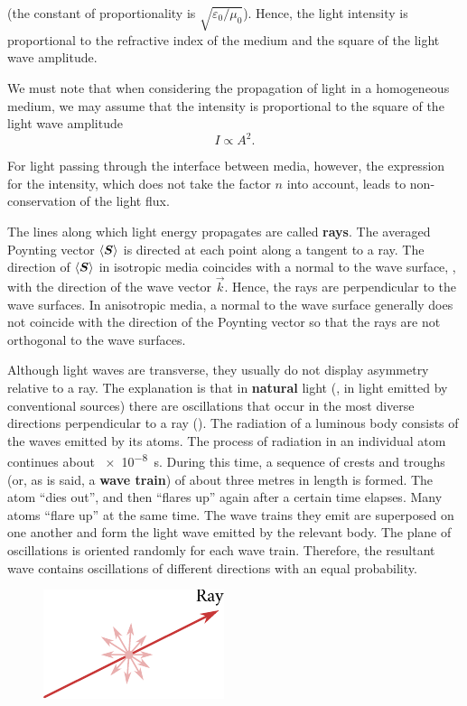 \noindent
(the constant of proportionality is $\sqrt{\varepsilon_0/\mu_0}$).
Hence, the light intensity is proportional to the refractive index of the medium and the square of the light wave amplitude.

We must note that when considering the propagation of light in a homogeneous medium, we may assume that the intensity is proportional to the square of the light wave amplitude
\begin{equation}\label{eq:16_10}
    I \propto A^2.
\end{equation}

\noindent
For light passing through the interface between media, however, the expression for the intensity, which does not take the factor $n$ into account, leads to non-conservation of the light flux.

The lines along which light energy propagates are called \textbf{rays}.
The averaged Poynting vector $\left\langle \boldsymbol{S} \right\rangle$ is directed at each point along a tangent to a ray.
The direction of $\left\langle \boldsymbol{S} \right\rangle$ in isotropic media coincides with a normal to the wave surface, \ie, with the direction of the wave vector $\vec{k}$.
Hence, the rays are perpendicular to the wave surfaces.
In anisotropic media, a normal to the wave surface generally does not coincide with the direction of the Poynting vector so that the rays are not orthogonal to the wave surfaces.

Although light waves are transverse, they usually do not display asymmetry relative to a ray.
The explanation is that in \textbf{natural} light (\ie, in light emitted by conventional sources) there are oscillations that occur in the most diverse directions perpendicular to a ray ().
The radiation of a luminous body consists of the waves emitted by its atoms.
The process of radiation in an individual atom continues about \SI{e-8}{\second}.
During this time, a sequence of crests and troughs (or, as is said, a \textbf{wave train}) of about three metres in length is formed.
The atom ``dies out'', and then ``flares up'' again after a certain time elapses.
Many atoms ``flare up'' at the same time.
The wave trains they emit are superposed on one another and form the light wave emitted by the relevant body.
The plane of oscillations is oriented randomly for each wave train.
Therefore, the resultant wave contains oscillations of different directions with an equal probability.

\begin{figure}[t]
	\begin{center}
		\includegraphics[scale=1]{figures/ch_16/fig_16_1.pdf}
		\caption[]{}
		\label{fig:16_1}
	\end{center}
	\vspace{-0.8cm}
\end{figure}


